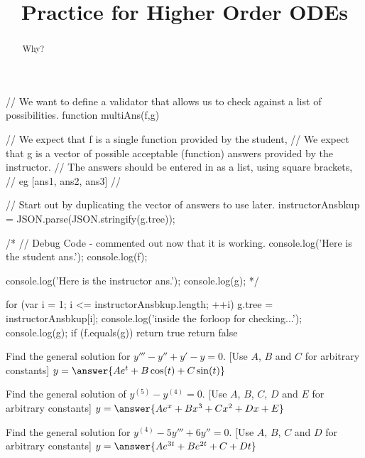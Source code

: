 \documentclass{ximera}
\title{Practice for Higher Order ODEs}
\begin{document}
\begin{abstract}
    Why?
\end{abstract}
\maketitle

\begin{javascript}
// We want to define a validator that allows us to check against a list of possibilities.
function multiAns(f,g) {
    // We expect that f is a single function provided by the student,
    // We expect that g is a vector of possible acceptable (function) answers provided by the instructor.
    //      The answers should be entered in as a list, using square brackets,
    //      eg [ans1, ans2, ans3]
    //
    
    // Start out by duplicating the vector of answers to use later.
    instructorAnsbkup = JSON.parse(JSON.stringify(g.tree));
    
    /* //   Debug Code - commented out now that it is working.
    console.log('Here is the student ans.');
    console.log(f);
    
    console.log('Here is the instructor ans.');
    console.log(g);
    */
    
    for (var i = 1; i <= instructorAnsbkup.length; ++i) {
        g.tree = instructorAnsbkup[i];
        console.log('inside the forloop for checking...');
        console.log(g);
        if (f.equals(g)){
            return true
        }
    }
return false
}
  
\end{javascript}

\begin{exercise}
    Find the general solution for $y''' - y'' + y' - y = 0$. [Use $A$, $B$ and $C$ for arbitrary constants] $y = \answer{Ae^t + B\cos(t) + C\sin(t)}$
\end{exercise}

\begin{exercise}%
    Find the general solution of $y^{(5)}-y^{(4)}=0$. [Use $A$, $B$, $C$, $D$ and $E$ for arbitrary constants] $y = \answer{A e^x + B x^3 + C x^2 + D x + E}$
\end{exercise}

\begin{exercise}
    Find the general solution for $y^{(4)} - 5 y''' + 6 y'' = 0$. [Use $A$, $B$, $C$ and $D$ for arbitrary constants] $y = \answer{Ae^{3t} + Be^{2t} + C + Dt}$
\end{exercise}
\end{document}
